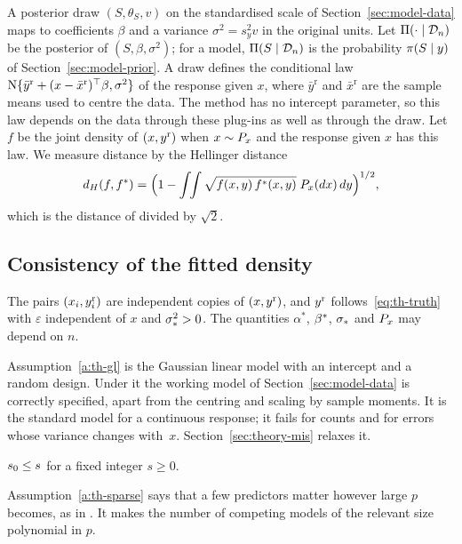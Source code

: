A posterior draw $(S,\theta_S,v)$ on the standardised scale of Section~\ref{sec:model-data} maps to coefficients
$\beta$ and a variance $\sigma^2=s_y^2v$ in the original units. Let $\Pi(\cdot\mid\mathcal D_n)$ be the posterior of
$(S,\beta,\sigma^2)$; for a model, $\Pi(S\mid\mathcal D_n)$ is the probability $\pi(S\mid y)$ of
Section~\ref{sec:model-prior}. A draw defines the conditional law $\mathrm{N}\{\bar y^{\mathrm r}+(x-\bar x^{\mathrm r})^\top\beta,\sigma^2\}$ of the
response given $x$, where $\bar y^{\mathrm r}$ and $\bar x^{\mathrm r}$ are the sample means used to centre the data. The method has no
intercept parameter, so this law depends on the data through these plug-ins as well as through the draw. Let $f$ be the
joint density of $(x,y^{\mathrm r})$ when $x\sim P_x$ and the response given $x$ has this law. We measure distance by the
Hellinger distance
\[
  d_H(f,f^*)=\Big(1-\int\!\!\int\sqrt{f(x,y)\,f^*(x,y)}\;P_x(dx)\,dy\Big)^{1/2},
\]
which is the distance of \citet{SongLiang2015} divided by $\sqrt2$.

\subsection{Consistency of the fitted density}\label{sec:theory-density}

\begin{assumption}\label{a:th-gl}
The pairs $(x_i,y^{\mathrm r}_i)$ are independent copies of $(x,y^{\mathrm r})$, and $y^{\mathrm r}$ follows~\eqref{eq:th-truth} with
$\varepsilon$ independent of $x$ and $\sigma_*^2>0$. The quantities $\alpha^*$, $\beta^*$, $\sigma_*$ and $P_x$ may depend
on $n$.
\end{assumption}

Assumption~\ref{a:th-gl} is the Gaussian linear model with an intercept and a random design. Under it the working
model of Section~\ref{sec:model-data} is correctly specified, apart from the centring and scaling by sample moments.
It is the standard model for a continuous response; it fails for counts and for errors whose variance changes
with~$x$. Section~\ref{sec:theory-mis} relaxes it.

\begin{assumption}[Sparsity]\label{a:th-sparse}
$s_0\le s$ for a fixed integer $s\ge0$.
\end{assumption}

Assumption~\ref{a:th-sparse} says that a few predictors matter however large $p$ becomes, as in
\citet{NarisettyHe2014}. It makes the number of competing models of the relevant size polynomial in $p$.

